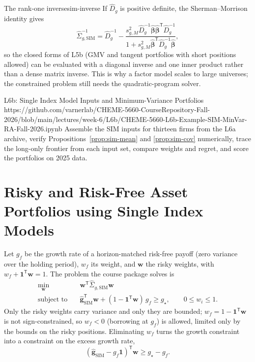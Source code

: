 \documentclass[11pt]{article}
\newcommand{\bw}{\mathbf w}
\newcommand{\bg}{\mathbf g}
\newcommand{\bbe}{\boldsymbol\beta}
\newcommand{\SigSIM}{\hat\Sigma_{g,\mathrm{SIM}}}
\newcommand{\gSIM}{\hat{\bg}_{\mathrm{SIM}}}
\begin{document}
\begin{remark}{The rank-one inverse}{sim-inverse}
If $\hat D_g$ is positive definite, the Sherman--Morrison identity gives
\begin{equation}
  \label{eq:sim-inverse}
  \SigSIM^{-1}
  =\hat D_g^{-1}
  -\frac{s^2_{g,M}\hat D_g^{-1}\hat{\bbe}\hat{\bbe}^{\mathsf T}\hat D_g^{-1}}
  {1+s^2_{g,M}\hat{\bbe}^{\mathsf T}\hat D_g^{-1}\hat{\bbe}},
\end{equation}
so the closed forms of L5b (GMV and tangent portfolios with short positions allowed) can be evaluated with a diagonal inverse and one inner product rather than a dense matrix inverse. This is why a factor model scales to large universes; the constrained problem  still needs the quadratic-program solver.
\end{remark}

\notebooklink
  {L6b: Single Index Model Inputs and Minimum-Variance Portfolios}
  {https://github.com/varnerlab/CHEME-5660-CourseRepository-Fall-2026/blob/main/lectures/week-6/L6b/CHEME-5660-L6b-Example-SIM-MinVar-RA-Fall-2026.ipynb}
  {Assemble the SIM inputs for thirteen firms from the L6a archive, verify Propositions~\ref{prop:sim-mean} and \ref{prop:sim-cov} numerically, trace the long-only frontier from each input set, compare weights and regret, and score the portfolios on 2025 data.}

\section{Risky and Risk-Free Asset Portfolios using Single Index Models}

Let $g_f$ be the growth rate of a horizon-matched risk-free payoff (zero variance over the holding period), $w_f$ its weight, and $\bw$ the risky weights, with $w_f+\mathbf 1^{\mathsf T}\bw=1$. The problem the course package solves is
\begin{equation}
  \label{eq:risky-riskfree-qp}
  \begin{aligned}
  \min_{\bw}\quad &\bw^{\mathsf T}\SigSIM\bw\\
  \text{subject to}\quad
    &\gSIM^{\mathsf T}\bw+(1-\mathbf 1^{\mathsf T}\bw)\,g_f\geq g_\star,\qquad
    0\le w_i\le1 .
  \end{aligned}
\end{equation}
Only the risky weights carry variance and only they are bounded; $w_f=1-\mathbf 1^{\mathsf T}\bw$ is not sign-constrained, so $w_f<0$ (borrowing at $g_f$) is allowed, limited only by the bounds on the risky positions. Eliminating $w_f$ turns the growth constraint into a constraint on the excess growth rate,
\begin{equation}
  \label{eq:excess-return-constraint}
  (\gSIM-g_f\mathbf 1)^{\mathsf T}\bw\geq g_\star-g_f .
\end{equation}
\end{document}
